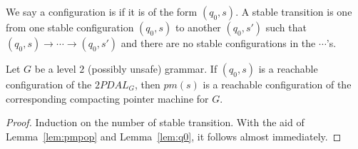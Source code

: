 We say a configuration is  if it is of the form
$(q_0, s)$. A stable transition is one from one stable
configuration $(q_0, s)$ to another $(q_0, s')$ such that $(q_0,
s) \rightarrow \cdots \rightarrow (q_0, s')$ and there are no
stable configurations in the $\cdots$'s.

\begin{lemma} Let $G$ be a level $2$ (possibly unsafe) grammar. If $(q_0, s)$ is a reachable configuration of the $2PDAL_G$, then $pm(s)$ is a reachable configuration of the corresponding compacting pointer
machine for $G$.
\end{lemma}

\begin{proof} Induction on the number of stable transition.
With the aid of Lemma~\ref{lem:pmpop} and Lemma~\ref{lem:q0}, it follows almost
immediately.
\end{proof}

